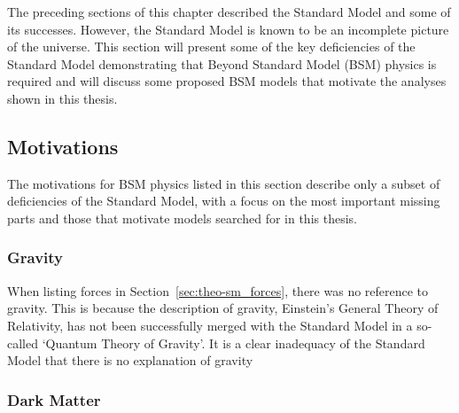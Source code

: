 The preceding sections of this chapter described the Standard Model and some of its successes.
However, the Standard Model is known to be an incomplete picture of the universe.
This section will present some of the key deficiencies of the Standard Model demonstrating that Beyond Standard Model (BSM) physics is required
and will discuss some proposed BSM models that motivate the analyses shown in this thesis.

\subsection{Motivations}

The motivations for BSM physics listed in this section
describe only a subset of deficiencies of the Standard Model,
with a focus on the most important missing parts and
those that motivate models searched for in this thesis.

\subsubsection{Gravity}

When listing forces in Section~\ref{sec:theo-sm_forces}, there was no reference to gravity.
This is because the description of gravity, Einstein's General Theory of Relativity,
has not been successfully merged with the Standard Model in a so-called `Quantum Theory of Gravity'.
It is a clear inadequacy of the Standard Model that there is no explanation of gravity

\subsubsection{Dark Matter}
\label{sec:theo_bsm_dm}


